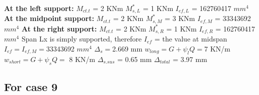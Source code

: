 \documentclass{article}%
\begin{document}
%
\newline%
\newline%
%
\textbf{At the left support:}%
\newline%
\newline%
%
$M_{ct.t}$ = 2 KNm%
\newline%
%
$M_{s,L}^{*}$ = 1 KNm%
\newline%
%
$I_{ef,L}$ = 162760417 $mm^{4}$%
\newline%
\newline%
%
\textbf{At the midpoint support:}%
\newline%
\newline%
%
$M_{ct.t}$ = 2 KNm%
\newline%
%
$M_{s,M}^{*}$ = 3 KNm%
\newline%
%
$I_{ef,M}$ = 33343692 $mm^{4}$%
\newline%
\newline%
%
\textbf{At the right support:}%
\newline%
\newline%
%
$M_{ct.t}$ = 2 KNm%
\newline%
%
$M_{s,R}^{*}$ = 1 KNm%
\newline%
%
$I_{ef,R}$ = 162760417 $mm^{4}$%
\newline%
\newline%
%
Span Lx is simply supported, therefore $I_{ef}$ = the value at midspan%
\newline%
\newline%
%
$I_{ef} = I_{ef,M} = $33343692 $ mm^{4}$%
\newline%
\newline%
%
$\Delta_{s} =$2.669 mm%
\newline%
\newline%
%
$w_{long} = G + \psi_{l}Q = $7 KN/m%
\newline%
%
$w_{short} = G + \psi_{s}Q = $ 8 KN/m%
\newline%
\newline%
%
$\Delta_{s.sus}$ = 0.65 mm%
\newline%
\newline%
%
$\Delta_{total}$ = 3.97 mm%
\subsection*{For case 9}%
\label{subsec:Forcase9}%
\end{document}
